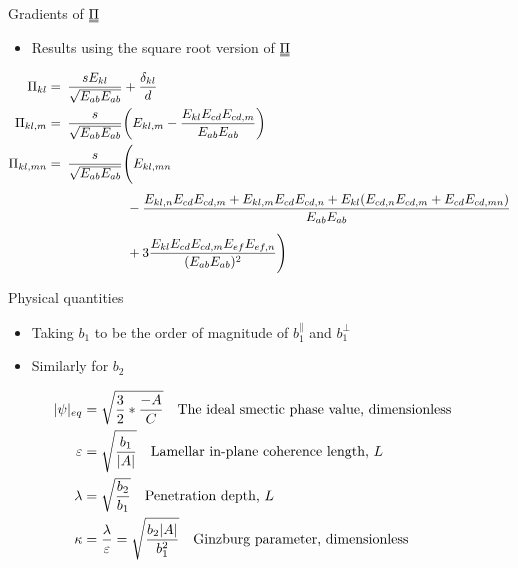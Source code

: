 \documentclass[10pt,notes]{beamer}
\newcommand{\duf}[2]{\stackunder[0.5pt]{\stackunder[0.8pt]{\stackunder[1pt]{\ensuremath{#1}}{\rule{\widthof{\ensuremath{#2}}*\real{0.9}}{.1ex}}}{\rule{\widthof{\ensuremath{#2}}*\real{0.9}}{.1ex}}}{}}
\newcommand{\du}[1]{\duf{#1}{#1}}
\newcommand{\PP}{\ensuremath{\du{\Pi}}}
\begin{document}
\begin{frame}[fragile]{Gradients of \PP}
    \newrefsection
    \begin{itemize}
        \item Results using the square root version of \PP
    \end{itemize}
    \scriptsize
    \begin{align*}
        \Pi_{kl} =&\enspace \frac{s E_{kl}}{\sqrt{E_{ab}E_{ab}}} + \frac{\delta_{kl}}{d} \\
        \Pi_{kl,m} =&\enspace \frac{s}{\sqrt{E_{ab}E_{ab}}} \qty(E_{kl,m} - \frac{E_{kl}E_{cd}E_{cd,m}}{E_{ab}E_{ab}}) \\
        \Pi_{kl,mn} =&\enspace \frac{s}{\sqrt{E_{ab}E_{ab}}} \Biggl(E_{kl,mn} \\ 
        &\phantom{\frac{s}{\sqrt{E_{ab}E_{ab}}} \Biggl(} -\frac{E_{kl,n}E_{cd}E_{cd,m} + E_{kl,m}E_{cd}E_{cd,n} + E_{kl}(E_{cd,n}E_{cd,m} + E_{cd}E_{cd,mn})}{E_{ab}E_{ab}} \\
        &\phantom{\frac{s}{\sqrt{E_{ab}E_{ab}}} \Biggl(} + 3\frac{E_{kl}E_{cd}E_{cd,m}E_{ef}E_{ef,n}}{(E_{ab}E_{ab})^2} \Biggr)
    \end{align*}
    \normalsize
\end{frame}

\begin{frame}[fragile]{Physical quantities}
    \newrefsection
    \begin{itemize}
        \item Taking $b_1$ to be the order of magnitude of $b_1^\parallel$ and $b_1^\perp$
        \item Similarly for $b_2$
    \end{itemize}
    \small
    \begin{align*}
        |\psi|_{eq} &= \sqrt{\frac{3}{2} * \frac{-A}{C}} \qq{The ideal smectic phase value, dimensionless}\\
        \varepsilon &= \sqrt{\frac{b_1}{|A|}} \qq{Lamellar in-plane coherence length, $L$} \\
        \lambda &= \sqrt{\frac{b_2}{b_1}} \qq{Penetration depth, $L$} \\
        \kappa &= \frac{\lambda}{\varepsilon} = \sqrt{\frac{b_2|A|}{b_1^2}} \qq{Ginzburg parameter, dimensionless}
    \end{align*}
\end{frame}
\end{document}
